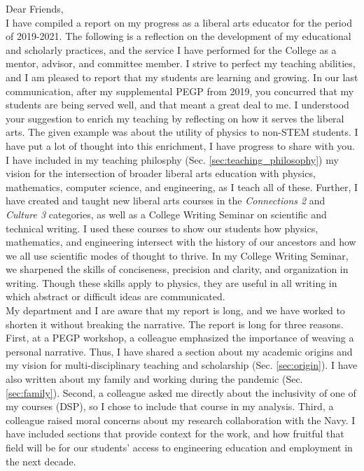\documentclass[../../main.tex]{subfiles}
\begin{document}
Dear Friends,
\\
\vspace{0.15cm}
I have compiled a report on my progress as a liberal arts educator for the period of 2019-2021.  The following is a reflection on the development of my educational and scholarly practices, and the service I have performed for the College as a mentor, advisor, and committee member.  I strive to perfect my teaching abilities, and I am pleased to report that my students are learning and growing.  In our last communication, after my supplemental PEGP from 2019, you concurred that my students are being served well, and that meant a great deal to me.  I understood your suggestion to enrich my teaching by reflecting on how it serves the liberal arts.  The given example was about the utility of physics to non-STEM students.  I have put a lot of thought into this enrichment, I have progress to share with you.
\\
\vspace{0.15cm}
I have included in my teaching philosphy (Sec. \ref{sec:teaching_philosophy}) my vision for the intersection of broader liberal arts education with physics, mathematics, computer science, and engineering, as I teach all of these.  Further, I have created and taught new liberal arts courses in the \textit{Connections 2} and \textit{Culture 3} categories, as well as a College Writing Seminar on scientific and technical writing.  I used these courses to show our students how physics, mathematics, and engineering intersect with the history of our ancestors and how we all use scientific modes of thought to thrive.  In my College Writing Seminar, we sharpened the skills of conciseness, precision and clarity, and organization in writing.  Though these skills apply to physics, they are useful in all writing in which abstract or difficult ideas are communicated.
\\
\vspace{0.15cm}
My department and I are aware that my report is long, and we have worked to shorten it without breaking the narrative.  The report is long for three reasons.  First, at a PEGP workshop, a colleague emphasized the importance of weaving a personal narrative.  Thus, I have shared a section about my academic origins and my vision for multi-disciplinary teaching and scholarship (Sec. \ref{sec:origin}).  I have also written about my family and working during the pandemic (Sec. \ref{sec:family}).  Second, a colleague asked me directly about the inclusivity of one of my courses (DSP), so I chose to include that course in my analysis.  Third, a colleague raised moral concerns about my research collaboration with the Navy.  I have included sections that provide context for the work, and how fruitful that field will be for our students' access to engineering education and employment in the next decade.
\end{document}
